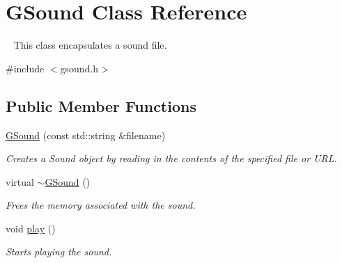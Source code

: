 \hypertarget{classGSound}{}\section{G\+Sound Class Reference}
\label{classGSound}


~\newline
 This class encapsulates a sound file.  




{\ttfamily \#include $<$gsound.\+h$>$}

\subsection*{Public Member Functions}
\begin{DoxyCompactItemize}
\item 
\mbox{\hyperlink{classGSound_a981dcd44480101dbeb769d9fb93ef9b2}{G\+Sound}} (const std\+::string \&filename)
\begin{DoxyCompactList}\small\item\em Creates a {\ttfamily Sound} object by reading in the contents of the specified file or U\+RL. \end{DoxyCompactList}\item 
virtual \mbox{\hyperlink{classGSound_a417fb21fbcfa4b731a58854dd4005da7}{$\sim$\+G\+Sound}} ()
\begin{DoxyCompactList}\small\item\em Frees the memory associated with the sound. \end{DoxyCompactList}\item 
void \mbox{\hyperlink{classGSound_a6d58098c6cf63c241ed03bc797256bb1}{play}} ()
\begin{DoxyCompactList}\small\item\em Starts playing the sound. \end{DoxyCompactList}\end{DoxyCompactItemize}
